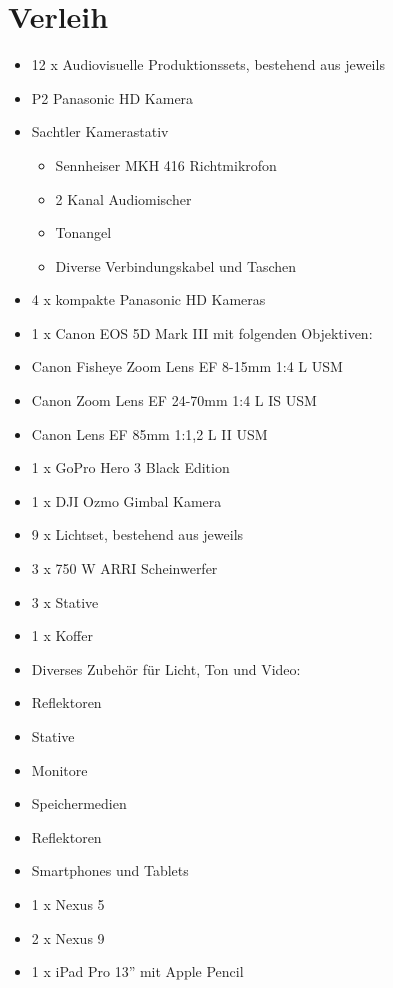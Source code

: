 \section{Verleih}\label{verleih}

\begin{itemize}
\item
  12 x Audiovisuelle Produktionssets, bestehend aus jeweils
\item
  P2 Panasonic HD Kamera
\item
  Sachtler Kamerastativ

  \begin{itemize}
  \tightlist
  \item
    Sennheiser MKH 416 Richtmikrofon
  \item
    2 Kanal Audiomischer
  \item
    Tonangel
  \item
    Diverse Verbindungskabel und Taschen
  \end{itemize}
\item
  4 x kompakte Panasonic HD Kameras
\item
  1 x Canon EOS 5D Mark III mit folgenden Objektiven:
\item
  Canon Fisheye Zoom Lens EF 8-15mm 1:4 L USM
\item
  Canon Zoom Lens EF 24-70mm 1:4 L IS USM
\item
  Canon Lens EF 85mm 1:1,2 L II USM
\item
  1 x GoPro Hero 3 Black Edition
\item
  1 x DJI Ozmo Gimbal Kamera
\item
  9 x Lichtset, bestehend aus jeweils
\item
  3 x 750 W ARRI Scheinwerfer
\item
  3 x Stative
\item
  1 x Koffer
\item
  Diverses Zubehör für Licht, Ton und Video:
\item
  Reflektoren
\item
  Stative
\item
  Monitore
\item
  Speichermedien
\item
  Reflektoren
\item
  Smartphones und Tablets
\item
  1 x Nexus 5
\item
  2 x Nexus 9
\item
  1 x iPad Pro 13'' mit Apple Pencil
\end{itemize}

